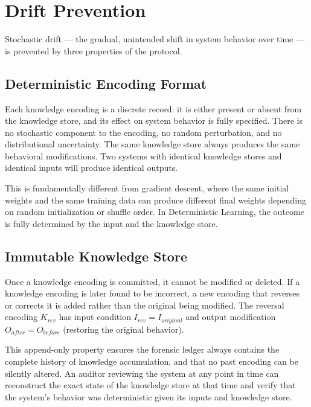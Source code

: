 \documentclass[12pt]{article}
\begin{document}
\section{Drift Prevention}
\label{sec:drift}

Stochastic drift --- the gradual, unintended shift in system behavior over time --- is prevented by three properties of the protocol.

\subsection{Deterministic Encoding Format}

Each knowledge encoding is a discrete record: it is either present or absent from the knowledge store, and its effect on system behavior is fully specified. There is no stochastic component to the encoding, no random perturbation, and no distributional uncertainty. The same knowledge store always produces the same behavioral modifications. Two systems with identical knowledge stores and identical inputs will produce identical outputs.

This is fundamentally different from gradient descent, where the same initial weights and the same training data can produce different final weights depending on random initialization or shuffle order. In Deterministic Learning, the outcome is fully determined by the input and the knowledge store.

\subsection{Immutable Knowledge Store}

Once a knowledge encoding is committed, it cannot be modified or deleted. If a knowledge encoding is later found to be incorrect, a new encoding that reverses or corrects it is added rather than the original being modified. The reversal encoding $K_{rev}$ has input condition $I_{rev} = I_{original}$ and output modification $O_{after} = O_{before}$ (restoring the original behavior).

This append-only property ensures the forensic ledger always contains the complete history of knowledge accumulation, and that no past encoding can be silently altered. An auditor reviewing the system at any point in time can reconstruct the exact state of the knowledge store at that time and verify that the system's behavior was deterministic given its inputs and knowledge store.
\end{document}

